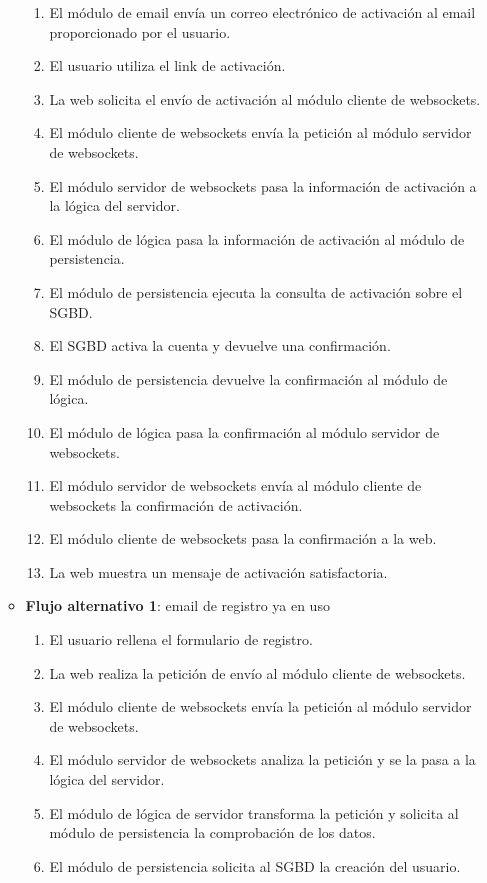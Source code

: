 \begin{enumerate}
\begin{itemize}
\begin{enumerate}
    \item El módulo de email envía un correo electrónico de activación al email proporcionado por el usuario.
    \item El usuario utiliza el link de activación.
    \item La web solicita el envío de activación al módulo cliente de websockets.
    \item El módulo cliente de websockets envía la petición al módulo servidor de websockets.
    \item El módulo servidor de websockets pasa la información de activación a la lógica del servidor.
    \item El módulo de lógica pasa la información de activación al módulo de persistencia.
    \item El módulo de persistencia ejecuta la consulta de activación sobre el SGBD.
    \item El SGBD activa la cuenta y devuelve una confirmación.
    \item El módulo de persistencia devuelve la confirmación al módulo de lógica.
    \item El módulo de lógica pasa la confirmación al módulo servidor de websockets.
    \item El módulo servidor de websockets envía al módulo cliente de websockets la confirmación de activación.
    \item El módulo cliente de websockets pasa la confirmación a la web.
    \item La web muestra un mensaje de activación satisfactoria.
    \end{enumerate}
  \item \textbf{Flujo alternativo 1}: email de registro ya en uso
    \begin{enumerate}
    \item El usuario rellena el formulario de registro.
    \item La web realiza la petición de envío al módulo cliente de websockets.
    \item El módulo cliente de websockets envía la petición al módulo servidor de websockets.
    \item El módulo servidor de websockets analiza la petición y se la pasa a la lógica del servidor.
    \item El módulo de lógica de servidor transforma la petición y solicita al módulo de persistencia la comprobación de los datos.
    \item El módulo de persistencia solicita al SGBD la creación del usuario.

\end{enumerate}
\end{itemize}
\end{enumerate}
